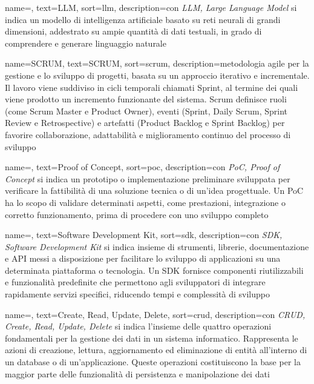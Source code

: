  {
    name=,
    text=LLM,
    sort=llm,
    description={con \emph{LLM, Large Language Model} si indica un modello di intelligenza artificiale basato su reti neurali di grandi dimensioni, addestrato su ampie quantità di dati testuali, in grado di comprendere e generare linguaggio naturale}
}

 {
    name=SCRUM,
    text=SCRUM,
    sort=scrum,
    description={metodologia agile per la gestione e lo sviluppo di progetti, basata su un approccio iterativo e incrementale. Il lavoro viene suddiviso in cicli temporali chiamati Sprint, al termine dei quali viene prodotto un incremento funzionante del sistema. Scrum definisce ruoli (come Scrum Master e Product Owner), eventi (Sprint, Daily Scrum, Sprint Review e Retrospective) e artefatti (Product Backlog e Sprint Backlog) per favorire collaborazione, adattabilità e miglioramento continuo del processo di sviluppo}
}

 {
    name=,
    text=Proof of Concept,
    sort=poc,
    description={con \emph{PoC, Proof of Concept} si indica un prototipo o implementazione preliminare sviluppata per verificare la fattibilità di una soluzione tecnica o di un’idea progettuale. Un PoC ha lo scopo di validare determinati aspetti, come prestazioni, integrazione o corretto funzionamento, prima di procedere con uno sviluppo completo}
    }

 {
    name=,
    text=Software Development Kit,
    sort=sdk,
    description={con \emph{SDK, Software Development Kit} si indica insieme di strumenti, librerie, documentazione e API messi a disposizione per facilitare lo sviluppo di applicazioni su una determinata piattaforma o tecnologia. Un SDK fornisce componenti riutilizzabili e funzionalità predefinite che permettono agli sviluppatori di integrare rapidamente servizi specifici, riducendo tempi e complessità di sviluppo}
    }

 {
    name=,
    text={Create, Read, Update, Delete},
    sort=crud,
    description={con \emph{CRUD, Create, Read, Update, Delete} si indica l'insieme delle quattro operazioni fondamentali per la gestione dei dati in un sistema informatico. Rappresenta le azioni di creazione, lettura, aggiornamento ed eliminazione di entità all’interno di un database o di un’applicazione. Queste operazioni costituiscono la base per la maggior parte delle funzionalità di persistenza e manipolazione dei dati}}
    
